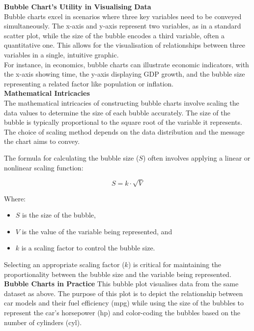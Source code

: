 \documentclass{article}\usepackage[]{graphicx}\usepackage[]{xcolor}
\begin{document}
\textbf{Bubble Chart's Utility in Visualising Data}\\
Bubble charts excel in scenarios where three key variables need to be conveyed simultaneously. The x-axis and y-axis represent two variables, as in a standard scatter plot, while the size of the bubble encodes a third variable, often a quantitative one. This allows for the visualisation of relationships between three variables in a single, intuitive graphic.\\
For instance, in economics, bubble charts can illustrate economic indicators, with the x-axis showing time, the y-axis displaying GDP growth, and the bubble size representing a related factor like population or inflation. \\

\textbf{Mathematical Intricacies}\\
The mathematical intricacies of constructing bubble charts involve scaling the data values to determine the size of each bubble accurately. The size of the bubble is typically proportional to the square root of the variable it represents. The choice of scaling method depends on the data distribution and the message the chart aims to convey.

The formula for calculating the bubble size (\(S\)) often involves applying a linear or nonlinear scaling function:

\[
S = k \cdot \sqrt{V}
\]

Where:
\begin{itemize}
\item \(S\) is the size of the bubble,
\item \(V\) is the value of the variable being represented, and
\item \(k\) is a scaling factor to control the bubble size.
\end{itemize}

Selecting an appropriate scaling factor (\(k\)) is critical for maintaining the proportionality between the bubble size and the variable being represented.\\

\textbf{Bubble Charts in Practice}
 This bubble plot visualises data from the same dataset as above. The purpose of this plot is to depict the relationship between car models and their fuel efficiency (mpg) while using the size of the bubbles to represent the car's horsepower (hp) and color-coding the bubbles based on the number of cylinders (cyl).
\end{document}
